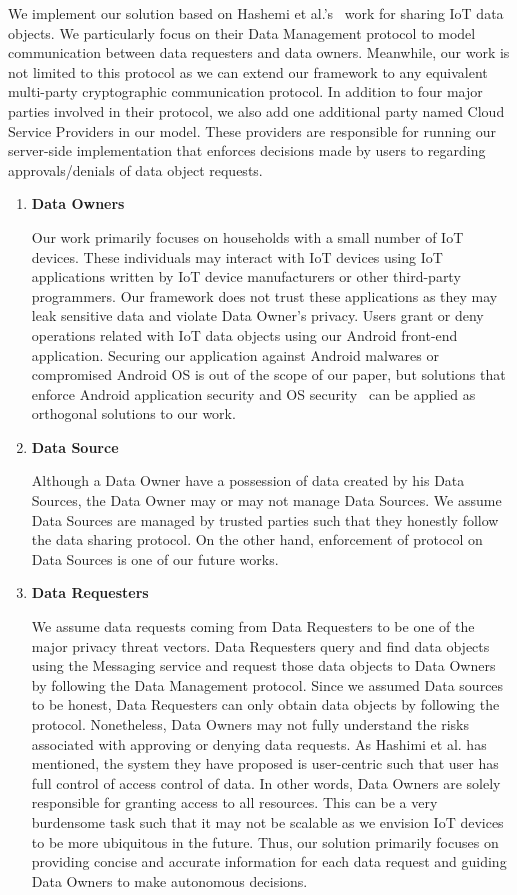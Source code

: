 We implement our solution based on Hashemi et al.'s~\cite{campbell} work for sharing IoT data objects. We particularly focus on their Data Management protocol to model communication between data requesters and data owners. Meanwhile, our work is not limited to this protocol as we can extend our framework to any equivalent multi-party cryptographic communication protocol. In addition to four major parties involved in their protocol, we also add one additional party named Cloud Service Providers in our model. These providers are responsible for running our server-side implementation that enforces decisions made by users to regarding approvals/denials of data object requests. 

\begin{enumerate}
\item \textbf {Data Owners} 

Our work primarily focuses on households with a small number of IoT devices. These individuals may interact with IoT devices using IoT applications written by IoT device manufacturers or other third-party programmers. Our framework does not trust these applications as they may leak sensitive data and violate Data Owner's privacy. Users grant or deny operations related with IoT data objects using our Android front-end  application. Securing our application against Android malwares or compromised Android OS is out of the scope of our paper, but solutions that enforce Android application security and OS security~\cite{tz} can be applied as orthogonal solutions to our work. 

\item \textbf{Data Source} 

Although a Data Owner have a possession of data created by his Data Sources, the Data Owner may or may not manage Data Sources. We assume Data Sources are managed by trusted parties such that they honestly follow the data sharing protocol. On the other hand, enforcement of protocol on Data Sources is one of our future works. 

\item \textbf {Data Requesters}

We assume data requests coming from Data Requesters to be one of the major privacy threat vectors. Data Requesters query and find data objects using the Messaging service and request those data objects to Data Owners by following the Data Management protocol. Since we assumed Data sources to be honest, Data Requesters can only obtain data objects by following the protocol. Nonetheless, Data Owners may not fully understand the risks associated with approving or denying data requests. As Hashimi et al. has mentioned, the system they have proposed is user-centric such that user has full control of access control of data. In other words, Data Owners are solely responsible for granting access to all resources. This can be a very burdensome task such that it may not be scalable as we envision IoT devices to be more ubiquitous in the future. Thus, our solution primarily focuses on providing concise and accurate information for each data request and guiding Data Owners to make autonomous decisions.


\end{enumerate}

